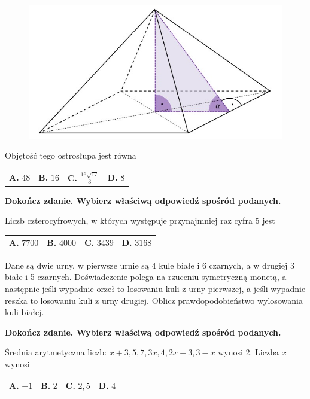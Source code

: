 \documentclass[12pt,a4paper]{article}
\theoremstyle{break}
\begin{document}
	\begin{figure}[h]
		\centering
		\includegraphics[scale=0.8]{pm5.jpeg}
	\end{figure}

	Objętość tego ostrosłupa jest równa
	
	\vspace{0.5cm}
	\begin{tabular}{p{3.5cm} p{3.5cm} p{3.5cm} p{3.5cm}}
		\textbf{A. }$48$&
		\textbf{B. }$16$&
		\textbf{C. }$\frac{16\sqrt{17}}{3}$&
		\textbf{D. }$8$\\
	\end{tabular}

	\begin{zad}[0-1]
		\textbf{Dokończ zdanie. Wybierz właściwą odpowiedź spośród podanych.}
	\end{zad} 
	
	Liczb czterocyfrowych, w których występuje przynajmniej raz cyfra 5 jest
	
	\vspace{0.5cm}
	\begin{tabular}{p{3.5cm} p{3.5cm} p{3.5cm} p{3.5cm}}
		\textbf{A. }$7700$&
		\textbf{B. }$4000$&
		\textbf{C. }$3439$&
		\textbf{D. }$3168$\\
	\end{tabular}


	\begin{zad}[0-2]
		Dane są dwie urny, w pierwsze urnie są 4 kule białe i 6 czarnych, a w drugiej 3 białe i 5 czarnych. Doświadczenie polega na rzuceniu symetryczną monetą, a następnie jeśli wypadnie orzeł to losowaniu kuli z urny pierwszej, a jeśli wypadnie reszka to losowaniu kuli z urny drugiej. Oblicz prawdopodobieństwo wylosowania kuli białej.
	\end{zad} 
	
	
	\begin{zad}[0-1]
		\textbf{Dokończ zdanie. Wybierz właściwą odpowiedź spośród podanych.}
	\end{zad} 
	
	Średnia arytmetyczna liczb: $x+3,5,7,3x,4,2x-3,3-x$ wynosi 2. Liczba $x$ wynosi
	
	\vspace{0.5cm}
	\begin{tabular}{p{3.5cm} p{3.5cm} p{3.5cm} p{3.5cm}}
		\textbf{A. }$-1$&
		\textbf{B. }$2$&
		\textbf{C. }$2,5$&
		\textbf{D. }$4$\\
	\end{tabular}
	
\end{document}
